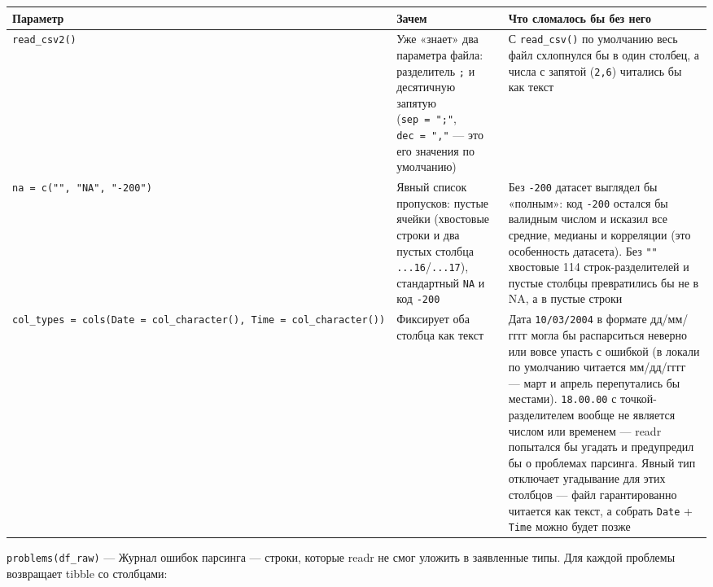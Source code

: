 \documentclass[
]{article}
\newcounter{none} %
\begin{document}
{\def\LTcaptype{none} %
\begin{longtable}[]{@{}
  >{\raggedright\arraybackslash}p{}
  >{\raggedright\arraybackslash}p{}
  >{\raggedright\arraybackslash}p{}@{}}
\toprule\noalign{}
\begin{minipage}[b]{\linewidth}\raggedright
Параметр
\end{minipage} & \begin{minipage}[b]{\linewidth}\raggedright
Зачем
\end{minipage} & \begin{minipage}[b]{\linewidth}\raggedright
Что сломалось бы без него
\end{minipage} \\
\midrule\noalign{}
\endhead
\bottomrule\noalign{}
\endlastfoot
\texttt{read\_csv2()} & Уже «знает» два параметра файла: разделитель
\texttt{;} и десятичную запятую (\texttt{sep\ =\ ";"},
\texttt{dec\ =\ ","} --- это его значения по умолчанию) & С
\texttt{read\_csv()} по умолчанию весь файл схлопнулся бы в один
столбец, а числа с запятой (\texttt{2,6}) читались бы как текст \\
\texttt{na\ =\ c("",\ "NA",\ "-200")} & Явный список пропусков: пустые
ячейки (хвостовые строки и два пустых столбца
\texttt{...16}/\texttt{...17}), стандартный \texttt{NA} и код
\texttt{-200} & Без \texttt{-200} датасет выглядел бы «полным»: код
\texttt{-200} остался бы валидным числом и исказил все средние, медианы
и корреляции (это особенность датасета). Без \texttt{""} хвостовые 114
строк-разделителей и пустые столбцы превратились бы не в NA, а в пустые
строки \\
\texttt{col\_types\ =\ cols(Date\ =\ col\_character(),\ Time\ =\ col\_character())}
& Фиксирует оба столбца как текст & Дата \texttt{10/03/2004} в формате
дд/мм/гггг могла бы распарситься неверно или вовсе упасть с ошибкой (в
локали по умолчанию читается мм/дд/гггг --- март и апрель перепутались
бы местами). \texttt{18.00.00} с точкой-разделителем вообще не является
числом или временем --- readr попытался бы угадать и предупредил бы о
проблемах парсинга. Явный тип отключает угадывание для этих столбцов ---
файл гарантированно читается как текст, а собрать \texttt{Date} +
\texttt{Time} можно будет позже \\
\end{longtable}
}

\texttt{problems(df\_raw)} --- Журнал ошибок парсинга --- строки,
которые readr не смог уложить в заявленные типы. Для каждой проблемы
возвращает tibble со столбцами:
\end{document}
